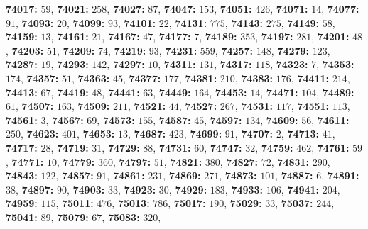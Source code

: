 \textsf{\bfseries 74017:} $59$, \textsf{\bfseries 74021:} $258$, \textsf{\bfseries 74027:} $87$, \textsf{\bfseries 74047:} $153$, \textsf{\bfseries 74051:} $426$, \textsf{\bfseries 74071:} $14$, \textsf{\bfseries 74077:} $91$, \textsf{\bfseries 74093:} $20$, \textsf{\bfseries 74099:} $93$, \textsf{\bfseries 74101:} $22$, \textsf{\bfseries 74131:} $775$, \textsf{\bfseries 74143:} $275$, \textsf{\bfseries 74149:} $58$, \textsf{\bfseries 74159:} $13$, \textsf{\bfseries 74161:} $21$, \textsf{\bfseries 74167:} $47$, \textsf{\bfseries 74177:} $7$, \textsf{\bfseries 74189:} $353$, \textsf{\bfseries 74197:} $281$, \textsf{\bfseries 74201:} $48$, \textsf{\bfseries 74203:} $51$, \textsf{\bfseries 74209:} $74$, \textsf{\bfseries 74219:} $93$, \textsf{\bfseries 74231:} $559$, \textsf{\bfseries 74257:} $148$, \textsf{\bfseries 74279:} $123$, \textsf{\bfseries 74287:} $19$, \textsf{\bfseries 74293:} $142$, \textsf{\bfseries 74297:} $10$, \textsf{\bfseries 74311:} $131$, \textsf{\bfseries 74317:} $118$, \textsf{\bfseries 74323:} $7$, \textsf{\bfseries 74353:} $174$, \textsf{\bfseries 74357:} $51$, \textsf{\bfseries 74363:} $45$, \textsf{\bfseries 74377:} $177$, \textsf{\bfseries 74381:} $210$, \textsf{\bfseries 74383:} $176$, \textsf{\bfseries 74411:} $214$, \textsf{\bfseries 74413:} $67$, \textsf{\bfseries 74419:} $48$, \textsf{\bfseries 74441:} $63$, \textsf{\bfseries 74449:} $164$, \textsf{\bfseries 74453:} $14$, \textsf{\bfseries 74471:} $104$, \textsf{\bfseries 74489:} $61$, \textsf{\bfseries 74507:} $163$, \textsf{\bfseries 74509:} $211$, \textsf{\bfseries 74521:} $44$, \textsf{\bfseries 74527:} $267$, \textsf{\bfseries 74531:} $117$, \textsf{\bfseries 74551:} $113$, \textsf{\bfseries 74561:} $3$, \textsf{\bfseries 74567:} $69$, \textsf{\bfseries 74573:} $155$, \textsf{\bfseries 74587:} $45$, \textsf{\bfseries 74597:} $134$, \textsf{\bfseries 74609:} $56$, \textsf{\bfseries 74611:} $250$, \textsf{\bfseries 74623:} $401$, \textsf{\bfseries 74653:} $13$, \textsf{\bfseries 74687:} $423$, \textsf{\bfseries 74699:} $91$, \textsf{\bfseries 74707:} $2$, \textsf{\bfseries 74713:} $41$, \textsf{\bfseries 74717:} $28$, \textsf{\bfseries 74719:} $31$, \textsf{\bfseries 74729:} $88$, \textsf{\bfseries 74731:} $60$, \textsf{\bfseries 74747:} $32$, \textsf{\bfseries 74759:} $462$, \textsf{\bfseries 74761:} $59$, \textsf{\bfseries 74771:} $10$, \textsf{\bfseries 74779:} $360$, \textsf{\bfseries 74797:} $51$, \textsf{\bfseries 74821:} $380$, \textsf{\bfseries 74827:} $72$, \textsf{\bfseries 74831:} $290$, \textsf{\bfseries 74843:} $122$, \textsf{\bfseries 74857:} $91$, \textsf{\bfseries 74861:} $231$, \textsf{\bfseries 74869:} $271$, \textsf{\bfseries 74873:} $101$, \textsf{\bfseries 74887:} $6$, \textsf{\bfseries 74891:} $38$, \textsf{\bfseries 74897:} $90$, \textsf{\bfseries 74903:} $33$, \textsf{\bfseries 74923:} $30$, \textsf{\bfseries 74929:} $183$, \textsf{\bfseries 74933:} $106$, \textsf{\bfseries 74941:} $204$, \textsf{\bfseries 74959:} $115$, \textsf{\bfseries 75011:} $476$, \textsf{\bfseries 75013:} $786$, \textsf{\bfseries 75017:} $190$, \textsf{\bfseries 75029:} $33$, \textsf{\bfseries 75037:} $244$, \textsf{\bfseries 75041:} $89$, \textsf{\bfseries 75079:} $67$, \textsf{\bfseries 75083:} $320$, 
